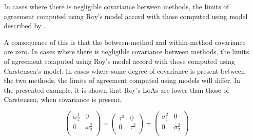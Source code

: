 \documentclass[12pt, a4paper]{report}
\theoremstyle{plain}
\theoremstyle{definition}
\theoremstyle{remark}
\begin{document}
	
	
	
	
	
	
	
	
	
	In cases where there is negligible covariance between methods, the limits of agreement computed using Roy's model accord with those computed using model described by \citet{BXC2008}. 
	
	
	
	A consequence of this is that the between-method and within-method covariance are zero. In cases where there is negligible covariance between methods, the limits of agreement computed using Roy's model accord with those computed using Carstensen's model. In cases where some degree of covariance is present between the two methods, the limits of agreement computed using models will differ. In the presented example, it is shown that Roy's LoAs are lower than those of Carstensen, when covariance is present. 
	
	\[\left(\begin{array}{cc}
	\omega^1_2  & 0 \\
	0 & \omega^2_2 \\
	\end{array}  \right)
	=  \left(
	\begin{array}{cc}
	\tau^2  & 0 \\
	0 & \tau^2 \\
	\end{array} \right)+
	\left(
	\begin{array}{cc}
	\sigma^2_1  & 0 \\
	0 & \sigma^2_2 \\
	\end{array}\right)
	\]
	
\end{document}
